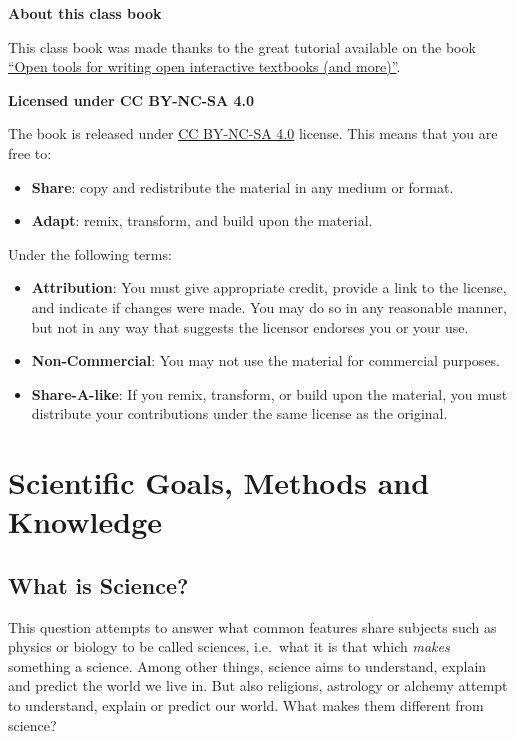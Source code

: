 \documentclass[
]{book}
\providecommand{\tightlist}{%
  \setlength{\itemsep}{0pt}\setlength{\parskip}{0pt}}
\begin{document}
\textbf{About this class book}

This class book was made thanks to the great tutorial available on the book \href{https://www.crumplab.com/OER_bookdown}{``Open tools for writing open interactive textbooks (and more)''}.

\textbf{Licensed under CC BY-NC-SA 4.0}

The book is released under \href{https://creativecommons.org/licenses/by-nc-sa/4.0/}{CC BY-NC-SA 4.0} license. This means that you are free to:

\begin{itemize}
\tightlist
\item
  \textbf{Share}: copy and redistribute the material in any medium or format.
\item
  \textbf{Adapt}: remix, transform, and build upon the material.
\end{itemize}

Under the following terms:

\begin{itemize}
\tightlist
\item
  \textbf{Attribution}: You must give appropriate credit, provide a link to the license, and indicate if changes were made. You may do so in any reasonable manner, but not in any way that suggests the licensor endorses you or your use.
\item
  \textbf{Non-Commercial}: You may not use the material for commercial purposes.
\item
  \textbf{Share-A-like}: If you remix, transform, or build upon the material, you must distribute your contributions under the same license as the original.
\end{itemize}

\hypertarget{scientific-goals-methods-and-knowledge}{%
\chapter{Scientific Goals, Methods and Knowledge}\label{scientific-goals-methods-and-knowledge}}

\hypertarget{what-is-science}{%
\section{What is Science?}\label{what-is-science}}

This question attempts to answer what common features share subjects such as physics or biology to be called sciences, i.e.~what it is that which \emph{makes} something a science. Among other things, science aims to understand, explain and predict the world we live in. But also religions, astrology or alchemy attempt to understand, explain or predict our world. What makes them different from science?
\end{document}
